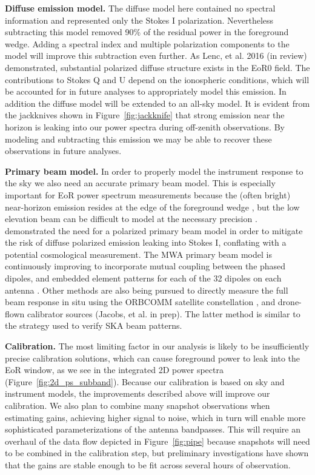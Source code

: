 \documentclass[iop]{emulateapj}
\begin{document}
\textbf{Diffuse emission model.} The diffuse model here contained no spectral information
and represented only the Stokes I polarization. Nevertheless subtracting this model removed
90\% of the residual power in the foreground wedge. Adding a spectral index and multiple
polarization components to the model will improve this subtraction even further.
As Lenc, et al. 2016 (in review) demonstrated, substantial polarized diffuse structure
exists in the EoR0 field. The contributions to Stokes Q and U depend on the ionospheric
conditions, which will be accounted for in future analyses to appropriately model this
emission. 
In addition the diffuse model will be extended to an all-sky model. It is evident from the
jackknives shown in Figure~\ref{fig:jackknife} that strong emission near the horizon is
leaking into our power spectra during off-zenith observations. By modeling and subtracting
this emission we may be able to recover these observations in future analyses.

\textbf{Primary beam model.} In order to properly model the instrument response to the sky
we also need an accurate primary beam model. This is especially important for EoR
power spectrum measurements because the (often bright) near-horizon emission resides
at the edge of the foreground wedge 
\citep{Pober:2016, Thyagarajan:2015, Thyagarajan:2015b}, but the low elevation beam
can be difficult to model at the necessary precision \citep{Thyagarajan:2016}. 
\citealt{Asad:2016} demonstrated the need for a polarized primary beam model in order
to mitigate the risk of diffuse polarized emission leaking into Stokes I, conflating with a 
potential cosmological measurement. The MWA
primary beam model is continuously improving to incorporate mutual coupling between the 
phased dipoles, and embedded element patterns for each of the 32 dipoles on each antenna 
\citep{Sutinjo:2015}. Other methods are also being pursued to directly measure the full beam 
response in situ using the ORBCOMM satellite constellation \citep{Neben:2015}, and 
drone-flown calibrator sources (Jacobs, et al. in prep). The latter method is similar to
the strategy \citealt{Virone:2014} used to verify SKA beam patterns.

\textbf{Calibration.} The most limiting factor in our analysis is likely to be insufficiently
precise calibration solutions, which can cause foreground power to leak into the EoR window,
as we see in the integrated 2D power spectra (Figure~\ref{fig:2d_ps_subband}).
Because our calibration is based on sky and instrument models, the improvements
described above will improve our calibration. We also plan to combine many snapshot
observations when estimating gains, achieving higher signal to noise, which in turn will
enable more sophisticated parameterizations of the antenna bandpasses. This will require
an overhaul of the data flow depicted in Figure~\ref{fig:pipe} because snapshots will need
to be combined in the calibration step, but preliminary investigations have shown that the
gains are stable enough to be fit across several hours of observation.
\end{document}
